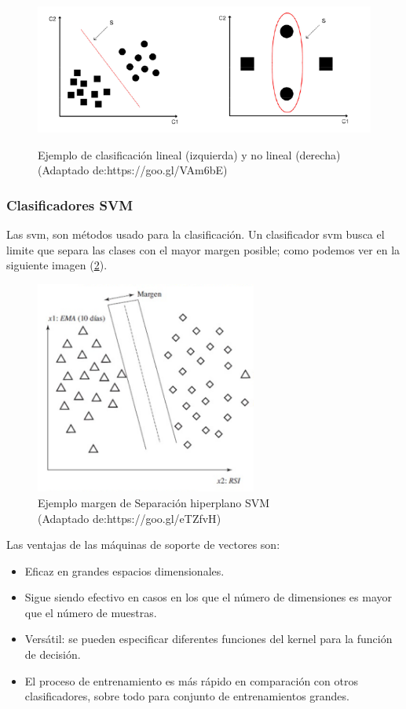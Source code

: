 \begin{figure}[h]
 \centering
  \includegraphics[height=5cm,keepaspectratio=true,clip=true]{imagenes/Logos/clasificador.png}
  \caption{Ejemplo de clasificación lineal (izquierda) y no lineal (derecha) (Adaptado de:{https://goo.gl/VAm6bE})}
	\label{Fig: clasif}
\end{figure}

\subsubsection{Clasificadores SVM}\label{sub:svm}
Las \ac{svm}, son métodos usado para la clasificación. Un clasificador \ac{svm} busca el limite que separa las clases con el mayor margen posible; como podemos ver en la siguiente imagen (\ref{Fig: margenseparacionsvm}).

\begin{figure}[H]
 \centering
  \includegraphics[height=7cm,keepaspectratio=true,clip=true]{imagenes/Logos/separacionsvm.png}
  \caption{Ejemplo margen de Separación hiperplano SVM \\(Adaptado de:{https://goo.gl/eTZfvH})}
	\label{Fig: margenseparacionsvm}
\end{figure}

Las ventajas de las máquinas de soporte de vectores son:
\begin{itemize}
\item Eficaz en grandes espacios dimensionales.
\item Sigue siendo efectivo en casos en los que el número de dimensiones es mayor que el número de muestras.
\item Versátil: se pueden especificar diferentes funciones del kernel para la función de decisión.
\item El proceso de entrenamiento es más rápido en comparación con otros clasificadores, sobre todo para conjunto de entrenamientos grandes.
\end{itemize}



